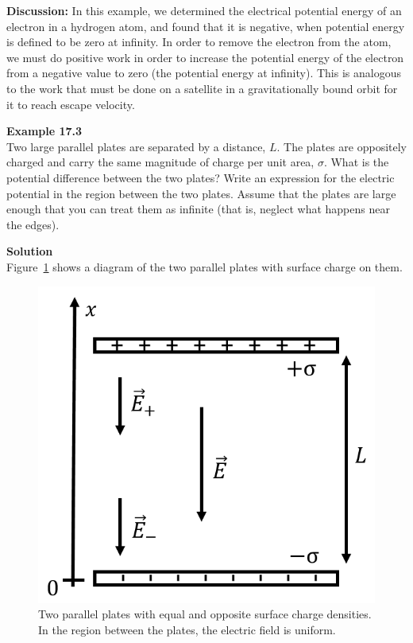 \begin{framed}
\begin{framed}
\textbf{Discussion:} In this example, we determined the electrical potential energy of an electron in a hydrogen atom, and found that it is negative, when potential energy is defined to be zero at infinity. In order to remove the electron from the atom, we must do positive work in order to increase the potential energy of the electron from a negative value to zero (the potential energy at infinity). This is analogous to the work that must be done on a satellite in a gravitationally bound orbit for it to reach escape velocity.
\end{framed}
\end{framed}

\begin{framed}
\textbf{Example 17.3}\\
Two large parallel plates are separated by a distance, $L$. The plates are oppositely charged and carry the same magnitude of charge per unit area, $\sigma$. What is the potential difference between the two plates? Write an expression for the electric potential in the region between the two plates. Assume that the plates are large enough that you can treat them as infinite (that is, neglect what happens near the edges).

\begin{framed}
\textbf{Solution}\\
Figure~\ref{fig:potential:parallelplates} shows a diagram of the two parallel plates with surface charge on them.

\begin{figure}[!htbp]
\centering
\includegraphics[width=0.3\linewidth]{files/parallelplates-a34555efaf5a4a7e277f17eaeca8f996.png}
\caption[]{Two parallel plates with equal and opposite surface charge densities. In the region between the plates, the electric field is uniform.}
\label{fig:potential:parallelplates}
\end{figure}


\end{framed}
\end{framed}
